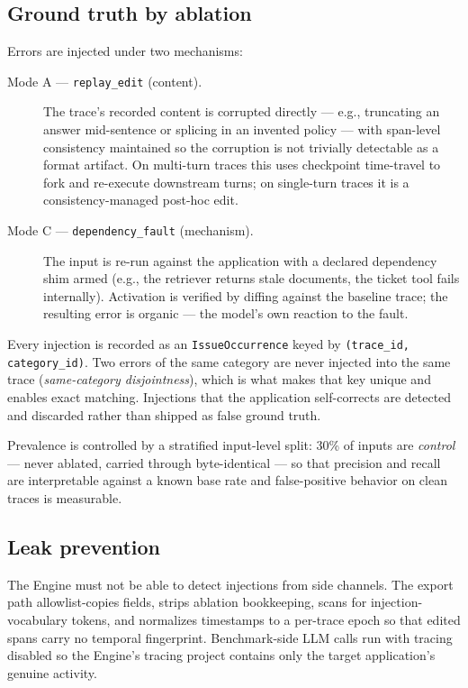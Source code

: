 \documentclass[11pt]{article}
\newcommand{\code}[1]{\texttt{#1}}
\begin{document}
\subsection{Ground truth by ablation}
\label{sec:ablation}

Errors are injected under two mechanisms:

\begin{description}
  \item[Mode A --- \code{replay\_edit} (content).] The trace's recorded content is corrupted directly --- e.g., truncating an answer mid-sentence or splicing in an invented policy --- with span-level consistency maintained so the corruption is not trivially detectable as a format artifact. On multi-turn traces this uses checkpoint time-travel to fork and re-execute downstream turns; on single-turn traces it is a consistency-managed post-hoc edit.
  \item[Mode C --- \code{dependency\_fault} (mechanism).] The input is re-run against the application with a declared dependency shim armed (e.g., the retriever returns stale documents, the ticket tool fails internally). Activation is verified by diffing against the baseline trace; the resulting error is organic --- the model's own reaction to the fault.
\end{description}

Every injection is recorded as an \code{IssueOccurrence} keyed by \code{(trace\_id, category\_id)}. Two errors of the same category are never injected into the same trace (\emph{same-category disjointness}), which is what makes that key unique and enables exact matching. Injections that the application self-corrects are detected and discarded rather than shipped as false ground truth.

Prevalence is controlled by a stratified input-level split: 30\% of inputs are \emph{control} --- never ablated, carried through byte-identical --- so that precision and recall are interpretable against a known base rate and false-positive behavior on clean traces is measurable.

\subsection{Leak prevention}

The Engine must not be able to detect injections from side channels. The export path allowlist-copies fields, strips ablation bookkeeping, scans for injection-vocabulary tokens, and normalizes timestamps to a per-trace epoch so that edited spans carry no temporal fingerprint. Benchmark-side LLM calls run with tracing disabled so the Engine's tracing project contains only the target application's genuine activity.
\end{document}
